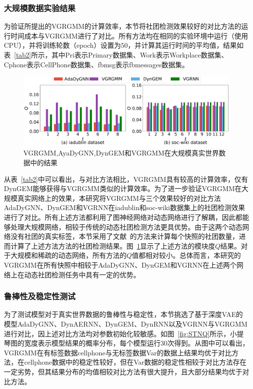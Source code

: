 \subsubsection{大规模数据实验结果}
为验证所提出的VGRGMM的计算效率，本节将社团检测效果较好的对比方法的运行时间成本与VGRGMM进行了对比。所有方法均在相同的实验环境中运行（使用CPU），并将训练轮数（epoch）设置为$50$，并计算其运行时间的平均值，结果如表~\ref{tab2}所示，其中Pri表示Primary数据集、Work表示Workplace数据集、Cphone表示CellPhone数据集、fbmsg表示fbmessages数据集。
\begin{figure}
    \centering
    \includegraphics[width=.8\textwidth]{figures/chap06/chap5bigdata-ia-soc.pdf}
    \caption{VGRGMM,AyaDyGNN,DynGEM和VGRGMM在大规模真实世界数据中的结果}
    \label{fig:iadublin}
\end{figure}


从表~\ref{tab2}中可以看出，与对比方法相比，VGRGMM具有较高的计算效率，仅有DynGEM能够获得与VGRGMM类似的计算效率。为了进一步验证VGRGMM在大规模真实网络上的效果，本研究将VGRGMM与三个效果较好的对比方法AdaDyGNN、DynGEM和VGRNN在iadublin和soc-wiki数据集上的社团检测效果进行了对比。所有上述方法都利用了图神经网络对动态网络进行了解耦，因此都能够处理大规模网络，相较于传统的动态社团检测方法更具优势。由于这两个动态网络没有社团的真实标签，本节采用了文献~\cite{Krzakala.2013.Zhang}的方法来计算每个快照的社团数量，进而计算了上述方法方法的社团检测结果。图~\ref{fig:iadublin}显示了上述方法的模块度$Q$结果。对于大规模和稀疏的动态网络，所有方法的$Q$值都相对较小。总体而言，本研究的VGRGMM在所有快照中相较于AdaDyGNN、DynGEM和VGRNN在上述两个网络上在动态社团检测任务中具有一定的优势。

%

\subsubsection{鲁棒性及稳定性测试}
为了测试模型对于真实世界数据的鲁棒性与稳定性，本节挑选了基于深度VAE的模型AdaDyGNN、DynAERNN、DynGEM、DynRNN以及VGRNN与VGRGMM进行对比，因上述对比方法均对参数初始化较敏感。如图~\ref{fig:STNQ}所示，小提琴图的宽度表示模型结果的概率分布，每个模型运行$30$次得到。从图中可以看出，VGRGMM在有标签数据cellphone与无标签数据Var的数据上结果均优于对比方法，在cellphone数据中的稳定性较好，但在Var数据的稳定性相较于对比方法存在一定劣势，但其结果分布的均值相较对比方法有很大提升，且大部分结果均优于对比方法。

